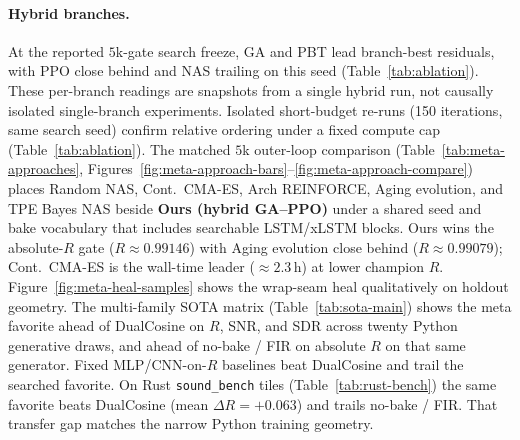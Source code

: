 \paragraph{Hybrid branches.}
At the reported $5$k-gate search freeze, GA and PBT lead branch-best residuals, with PPO close behind and NAS trailing on this seed (Table~\ref{tab:ablation}).
These per-branch readings are snapshots from a single hybrid run, not causally isolated single-branch experiments.
Isolated short-budget re-runs (150 iterations, same search seed) confirm relative ordering under a fixed compute cap (Table~\ref{tab:ablation}).
The matched $5$k outer-loop comparison (Table~\ref{tab:meta-approaches}, Figures~\ref{fig:meta-approach-bars}--\ref{fig:meta-approach-compare}) places Random NAS, Cont.\ CMA-ES, Arch REINFORCE, Aging evolution, and TPE Bayes NAS beside \textbf{Ours (hybrid GA--PPO)} under a shared seed and bake vocabulary that includes searchable LSTM/xLSTM blocks.
Ours wins the absolute-$R$ gate ($R\approx 0.99146$) with Aging evolution close behind ($R\approx 0.99079$); Cont.\ CMA-ES is the wall-time leader ($\approx 2.3$\,h) at lower champion $R$.
Figure~\ref{fig:meta-heal-samples} shows the wrap-seam heal qualitatively on holdout geometry.
The multi-family SOTA matrix (Table~\ref{tab:sota-main}) shows the meta favorite ahead of DualCosine on $R$, SNR, and SDR across twenty Python generative draws, and ahead of no-bake / FIR on absolute $R$ on that same generator.
Fixed MLP/CNN-on-$R$ baselines beat DualCosine and trail the searched favorite.
On Rust \texttt{sound\_bench} tiles (Table~\ref{tab:rust-bench}) the same favorite beats DualCosine (mean $\Delta R={+}0.063$) and trails no-bake / FIR. That transfer gap matches the narrow Python training geometry.
